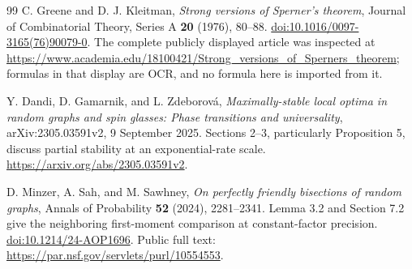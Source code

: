 \begin{thebibliography}{99}
C. Greene and D. J. Kleitman, \emph{Strong versions of Sperner's theorem}, Journal of Combinatorial Theory, Series A \textbf{20} (1976), 80--88. \href{https://doi.org/10.1016/0097-3165(76)90079-0}{doi:10.1016/0097-3165(76)90079-0}. The complete publicly displayed article was inspected at \url{https://www.academia.edu/18100421/Strong_versions_of_Sperners_theorem}; formulas in that display are OCR, and no formula here is imported from it.

Y. Dandi, D. Gamarnik, and L. Zdeborov\'a, \emph{Maximally-stable local optima in random graphs and spin glasses: Phase transitions and universality}, arXiv:2305.03591v2, 9 September 2025. Sections 2--3, particularly Proposition 5, discuss partial stability at an exponential-rate scale. \url{https://arxiv.org/abs/2305.03591v2}.

D. Minzer, A. Sah, and M. Sawhney, \emph{On perfectly friendly bisections of random graphs}, Annals of Probability \textbf{52} (2024), 2281--2341. Lemma 3.2 and Section 7.2 give the neighboring first-moment comparison at constant-factor precision. \href{https://doi.org/10.1214/24-AOP1696}{doi:10.1214/24-AOP1696}. Public full text: \url{https://par.nsf.gov/servlets/purl/10554553}.
\end{thebibliography}
